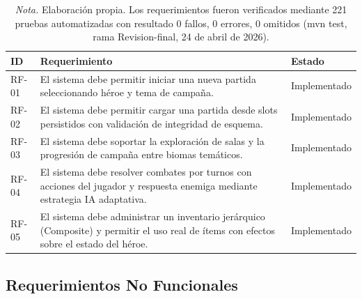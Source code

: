 \documentclass[stu,12pt,floatsintext]{apa7}
\begin{document}
\begin{table}[H]
\centering
\caption{Requerimientos funcionales del sistema}
\begin{tabular}{p{2cm}p{9cm}p{3cm}}
\toprule
\textbf{ID} & \textbf{Requerimiento} & \textbf{Estado} \\
\midrule
RF-01 & El sistema debe permitir iniciar una nueva partida seleccionando héroe y tema de campaña. & Implementado \\

RF-02 & El sistema debe permitir cargar una partida desde slots persistidos con validación de integridad de esquema. & Implementado \\

RF-03 & El sistema debe soportar la exploración de salas y la progresión de campaña entre biomas temáticos. & Implementado \\

RF-04 & El sistema debe resolver combates por turnos con acciones del jugador y respuesta enemiga mediante estrategia IA adaptativa. & Implementado \\

RF-05 & El sistema debe administrar un inventario jerárquico (Composite) y permitir el uso real de ítems con efectos sobre el estado del héroe. & Implementado \\
\bottomrule
\end{tabular}
\caption*{\textit{Nota.} Elaboración propia. Los requerimientos fueron verificados mediante 221 pruebas automatizadas con resultado 0 fallos, 0 errores, 0 omitidos (mvn test, rama Revision-final, 24 de abril de 2026).}
\end{table}


\subsection{Requerimientos No Funcionales}
\end{document}
